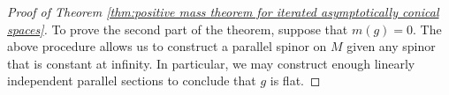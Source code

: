 \documentclass[12pt, reqno]{amsart}
\theoremstyle{plain} %
\theoremstyle{definition}
\theoremstyle{remark}
\numberwithin{equation}{section}
\begin{document}
\begin{proof}[Proof of Theorem \ref{thm:positive mass theorem for iterated asymptotically conical spaces}]
    To prove the second part of the theorem, suppose that \(m(g) = 0\).
    The above procedure allows us to construct a parallel spinor on \(M\) given any spinor that is constant at infinity.
    In particular, we may construct enough linearly independent parallel sections to conclude that \(g\) is flat.
\end{proof}



\end{document}
